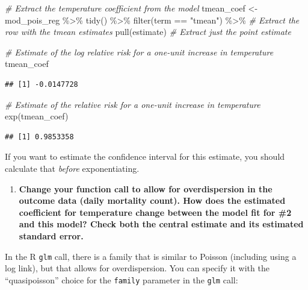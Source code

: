 \documentclass[
]{book}
\newenvironment{Shaded}{\begin{snugshade}}{\end{snugshade}}
\newcommand{\CommentTok}[1]{\textcolor[rgb]{0.56,0.35,0.01}{\textit{#1}}}
\newcommand{\FunctionTok}[1]{\textcolor[rgb]{0.00,0.00,0.00}{#1}}
\newcommand{\NormalTok}[1]{#1}
\newcommand{\OtherTok}[1]{\textcolor[rgb]{0.56,0.35,0.01}{#1}}
\newcommand{\SpecialCharTok}[1]{\textcolor[rgb]{0.00,0.00,0.00}{#1}}
\newcommand{\StringTok}[1]{\textcolor[rgb]{0.31,0.60,0.02}{#1}}
\providecommand{\tightlist}{%
  \setlength{\itemsep}{0pt}\setlength{\parskip}{0pt}}
\begin{document}
\begin{Shaded}
\begin{Highlighting}[]
\CommentTok{\# Extract the temperature coefficient from the model}
\NormalTok{tmean\_coef }\OtherTok{\textless{}{-}}\NormalTok{ mod\_pois\_reg }\SpecialCharTok{\%\textgreater{}\%} 
  \FunctionTok{tidy}\NormalTok{() }\SpecialCharTok{\%\textgreater{}\%} 
  \FunctionTok{filter}\NormalTok{(term }\SpecialCharTok{==} \StringTok{"tmean"}\NormalTok{) }\SpecialCharTok{\%\textgreater{}\%} \CommentTok{\# Extract the row with the tmean estimates}
  \FunctionTok{pull}\NormalTok{(estimate) }\CommentTok{\# Extract just the point estimate}

\CommentTok{\# Estimate of the log relative risk for a one{-}unit increase in temperature}
\NormalTok{tmean\_coef }
\end{Highlighting}
\end{Shaded}

\begin{verbatim}
## [1] -0.0147728
\end{verbatim}

\begin{Shaded}
\begin{Highlighting}[]
\CommentTok{\# Estimate of the relative risk for a one{-}unit increase in temperature}
\FunctionTok{exp}\NormalTok{(tmean\_coef)}
\end{Highlighting}
\end{Shaded}

\begin{verbatim}
## [1] 0.9853358
\end{verbatim}

If you want to estimate the confidence interval for this estimate, you should
calculate that \emph{before} exponentiating.

\begin{enumerate}
\def\labelenumi{\arabic{enumi}.}
\setcounter{enumi}{2}
\tightlist
\item
  \textbf{Change your function call to allow for overdispersion in the outcome data
  (daily mortality count). How does the estimated coefficient for temperature
  change between the model fit for \#2 and this model? Check both the central
  estimate and its estimated standard error.}
\end{enumerate}

In the R \texttt{glm} call, there is a family that is similar to Poisson (including
using a log link), but that allows for overdispersion. You can specify it
with the ``quasipoisson'' choice for the \texttt{family} parameter in the \texttt{glm} call:
\end{document}
